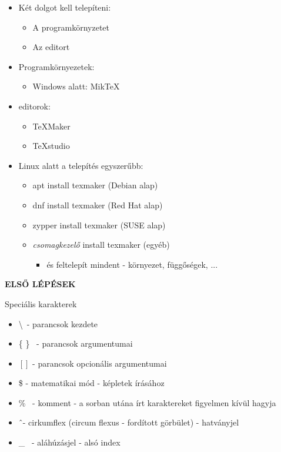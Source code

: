 \documentclass[11pt]{beamer}
\begin{document}
\begin{frame}
\begin{itemize}
\item Két dolgot kell telepíteni:
	\begin{itemize}
	\item A programkörnyzetet
	\item Az editort
	\end{itemize}
\item Programkörnyezetek:
	\begin{itemize}
	\item Windows alatt: MikTeX
	\end{itemize}
\item editorok:
	\begin{itemize}
	\item TeXMaker
	\item TeXstudio
	\end{itemize}
\end{itemize}

\begin{itemize}
\item Linux alatt a telepítés egyszerűbb:
	\begin{itemize}
	\item apt install texmaker (Debian alap)
	\item dnf install texmaker (Red Hat alap)
	\item zypper install texmaker (SUSE alap)
	\item \textit{csomagkezelő} install texmaker (egyéb)
		\begin{itemize}
		\item és feltelepít mindent - környezet, függőségek, ...
		\end{itemize}
	\end{itemize}
\end{itemize}
\end{frame}

\begin{frame}
\begin{center}
{\Huge \textbf{ELSŐ LÉPÉSEK}}
\end{center}
\end{frame}

\begin{frame}{Speciális karakterek}
\begin{itemize}
\item \textbackslash \ - parancsok kezdete
\item \{ \} \ - parancsok argumentumai
\item $\left[ \right]$ - parancsok opcionális argumentumai
\item \$ - matematikai mód - képletek írásához
\item \% \ - komment - a sorban utána írt karaktereket figyelmen kívül hagyja
\item \^ \ - cirkumflex (circum flexus - fordított görbület) - hatványjel
\item \_ \ - aláhúzásjel - alsó index
\end{itemize}
\end{frame}
\end{document}
